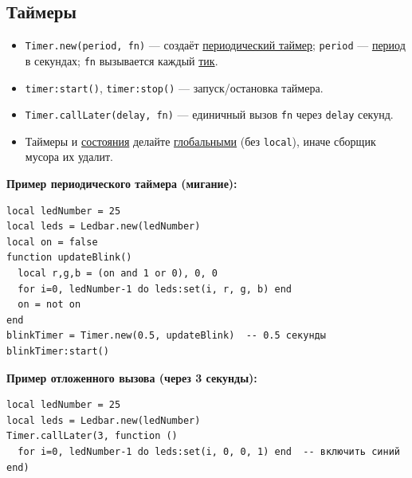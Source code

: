 \subsection{Таймеры}
\begin{itemize}
  \item \verb|Timer.new(period, fn)| — создаёт \hyperlink{term:timer}{периодический таймер}; \verb|period| — \hyperlink{term:period}{период} в секундах; \verb|fn| вызывается каждый \hyperlink{term:tick}{тик}.
  \item \verb|timer:start()|, \verb|timer:stop()| — запуск/остановка таймера.
  \item \verb|Timer.callLater(delay, fn)| — единичный вызов \verb|fn| через \verb|delay| секунд.
  \item Таймеры и \hyperlink{term:state}{состояния} делайте \hyperlink{term:scope}{глобальными} (без \verb|local|), иначе сборщик мусора их удалит.
\end{itemize}
\textbf{Пример периодического таймера (мигание):}
\begin{verbatim}
local ledNumber = 25
local leds = Ledbar.new(ledNumber)
local on = false
function updateBlink()
  local r,g,b = (on and 1 or 0), 0, 0
  for i=0, ledNumber-1 do leds:set(i, r, g, b) end
  on = not on
end
blinkTimer = Timer.new(0.5, updateBlink)  -- 0.5 секунды
blinkTimer:start()
\end{verbatim}
\textbf{Пример отложенного вызова (через 3 секунды):}
\begin{verbatim}
local ledNumber = 25
local leds = Ledbar.new(ledNumber)
Timer.callLater(3, function ()
  for i=0, ledNumber-1 do leds:set(i, 0, 0, 1) end  -- включить синий
end)
\end{verbatim}
